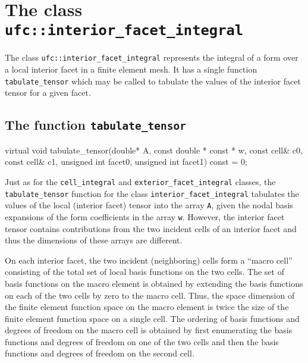 \section{The class \texttt{ufc::interior\_facet\_integral}}

The class \texttt{ufc::interior\_facet\_integral} represents the
integral of a form over a local interior facet in a finite element
mesh. It has a single function \texttt{tabulate\_tensor} which may be
called to tabulate the values of the interior facet tensor for a given
facet.

\subsection{The function \texttt{tabulate\_tensor}}

\begin{code}
virtual void tabulate_tensor(double* A,
                             const double * const * w,
                             const cell& c0,
                             const cell& c1,
                             unsigned int facet0,
                             unsigned int facet1) const = 0;
\end{code}

Just as for the \texttt{cell\_integral} and
\texttt{exterior\_facet\_integral} classes, the
\texttt{tabulate\_tensor} function for the class
\texttt{interior\_facet\_integral} tabulates the values of the local
(interior facet) tensor into the array \texttt{A}, given the nodal
basis expansions of the form coefficients in the array \texttt{w}.
However, the interior facet tensor contains contributions from the two
incident cells of an interior facet and thus the dimensions of these
arrays are different.

On each interior facet, the two incident (neighboring) cells form a
``macro cell'' consisting of the total set of local basis functions on
the two cells. The set of basis functions on the macro element is
obtained by extending the basis functions on each of the two cells by
zero to the macro cell. Thus, the space dimension of the finite
element function space on the macro element is twice the size of the
finite element function space on a single cell. The ordering of basis
functions and degrees of freedom on the macro cell is obtained by
first enumerating the basis functions and degrees of freedom on one of
the two cells and then the basis functions and degrees of freedom on
the second cell.

